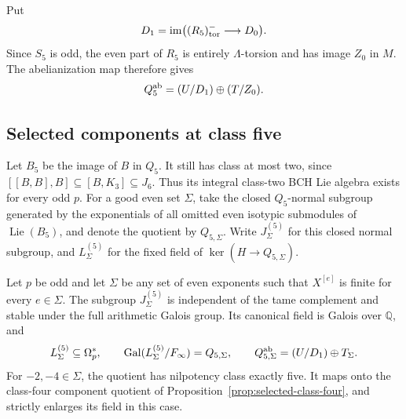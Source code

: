 Put
\[
 D_1=\operatorname{im}\bigl((R_5)_{\rm tor}^-
                                         \longrightarrow D_0\bigr).
\]
Since $S_5$ is odd, the even part of $R_5$ is entirely
$\Lambda$-torsion and has image $Z_0$ in $M$.
The abelianization map therefore gives
\begin{equation}\label{eq:class5-abelianization}
                         Q_5^{\rm ab}=(U/D_1)\oplus(T/Z_0).
\end{equation}

\subsection{Selected components at class five}
\label{subsec:selected-class-five}

Let $B_5$ be the image of $B$ in $Q_5$. It still has
class at most two, since
$[[B,B],B]\subseteq[B,K_3]\subseteq J_6$.
Thus its integral class-two BCH Lie algebra exists
for every odd $p$. For a good even set $\Sigma$, take
the closed $Q_5$-normal subgroup generated by the
exponentials of all omitted even isotypic submodules
of $\operatorname{Lie}(B_5)$, and denote the quotient
by $Q_{5,\Sigma}$. Write $J_\Sigma^{(5)}$ for this closed normal subgroup, and $L_\Sigma^{(5)}$ for the fixed field of $\ker(H\to Q_{5,\Sigma})$.



\begin{corollary}
\label{cor:selected-class-five}
Let $p$ be odd and let $\Sigma$ be any set of even exponents
such that $X^{[e]}$ is finite for every $e\in\Sigma$.
The subgroup $J_\Sigma^{(5)}$ is independent of the tame
complement and stable under the full arithmetic Galois group.
Its canonical field is Galois over $\mathbb Q$, and
\[
 L_\Sigma^{(5)}\subseteq\Omega_p^*,\qquad
 \operatorname{Gal}(L_\Sigma^{(5)}/F_\infty)=Q_{5,\Sigma},\qquad
 Q_{5,\Sigma}^{\rm ab}=(U/D_1)\oplus T_\Sigma.
\]
For $-2,-4\in\Sigma$, the quotient has nilpotency class
exactly five. It maps onto the class-four component
quotient of Proposition~\ref{prop:selected-class-four},
and strictly enlarges its field in this case.
\end{corollary}


